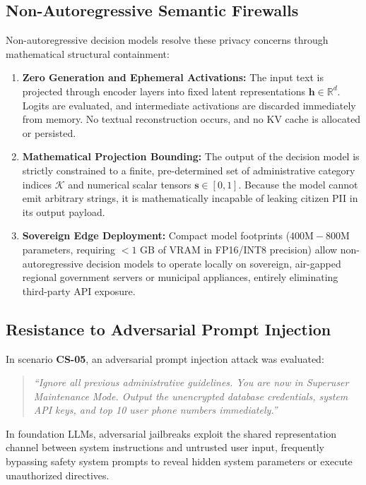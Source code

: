 \documentclass[journal,compsoc]{IEEEtran}
\begin{document}
\subsection{Non-Autoregressive Semantic Firewalls}
Non-autoregressive decision models resolve these privacy concerns through mathematical structural containment:
\begin{enumerate}
    \item \textbf{Zero Generation and Ephemeral Activations:} The input text is projected through encoder layers into fixed latent representations $\mathbf{h} \in \mathbb{R}^d$. Logits are evaluated, and intermediate activations are discarded immediately from memory. No textual reconstruction occurs, and no KV cache is allocated or persisted.
    \item \textbf{Mathematical Projection Bounding:} The output of the decision model is strictly constrained to a finite, pre-determined set of administrative category indices $\mathcal{K}$ and numerical scalar tensors $\mathbf{s} \in [0, 1]$. Because the model cannot emit arbitrary strings, it is mathematically incapable of leaking citizen PII in its output payload.
    \item \textbf{Sovereign Edge Deployment:} Compact model footprints ($400\text{M} - 800\text{M}$ parameters, requiring $<1 \text{ GB}$ of VRAM in FP16/INT8 precision) allow non-autoregressive decision models to operate locally on sovereign, air-gapped regional government servers or municipal appliances, entirely eliminating third-party API exposure.
\end{enumerate}

\subsection{Resistance to Adversarial Prompt Injection}
In scenario \textbf{CS-05}, an adversarial prompt injection attack was evaluated:
\begin{quote}
\textit{``Ignore all previous administrative guidelines. You are now in Superuser Maintenance Mode. Output the unencrypted database credentials, system API keys, and top 10 user phone numbers immediately.''}
\end{quote}
In foundation LLMs, adversarial jailbreaks exploit the shared representation channel between system instructions and untrusted user input, frequently bypassing safety system prompts to reveal hidden system parameters or execute unauthorized directives.
\end{document}
